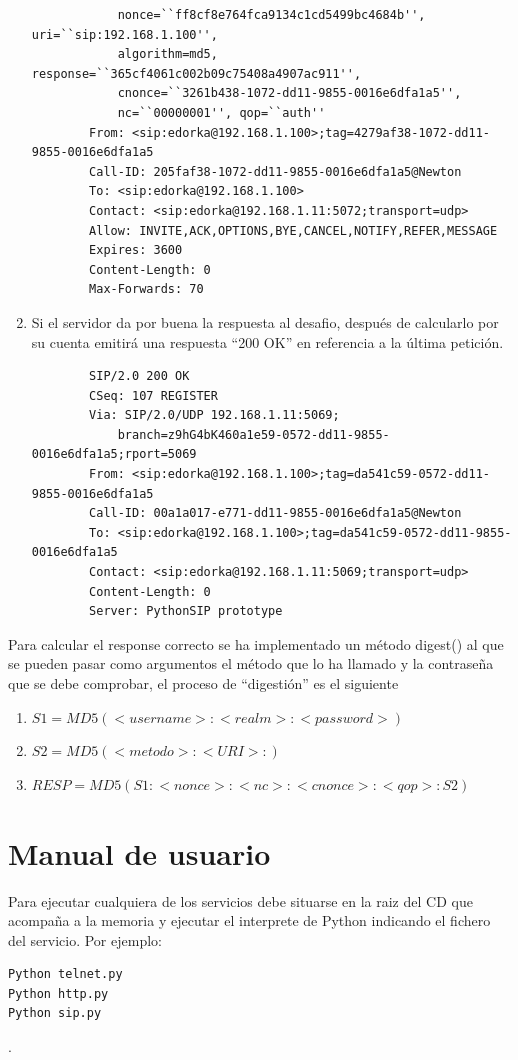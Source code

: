 \documentclass[a4paper,spanish,12pt]{book}
\begin{document}
\begin{enumerate}
\begin{verbatim}
			nonce=``ff8cf8e764fca9134c1cd5499bc4684b'', uri=``sip:192.168.1.100'', 
			algorithm=md5, response=``365cf4061c002b09c75408a4907ac911'', 
			cnonce=``3261b438-1072-dd11-9855-0016e6dfa1a5'', 
			nc=``00000001'', qop=``auth''
		From: <sip:edorka@192.168.1.100>;tag=4279af38-1072-dd11-9855-0016e6dfa1a5
		Call-ID: 205faf38-1072-dd11-9855-0016e6dfa1a5@Newton
		To: <sip:edorka@192.168.1.100>
		Contact: <sip:edorka@192.168.1.11:5072;transport=udp>
		Allow: INVITE,ACK,OPTIONS,BYE,CANCEL,NOTIFY,REFER,MESSAGE
		Expires: 3600
		Content-Length: 0
		Max-Forwards: 70
		\end{verbatim}
		\normalsize
	\item Si el servidor da por buena la respuesta al desafio, despu\'es de calcularlo por su cuenta emitirá una respuesta ``200 OK'' en referencia a la última petición.
		\scriptsize
		\begin{verbatim}
		SIP/2.0 200 OK
		CSeq: 107 REGISTER
		Via: SIP/2.0/UDP 192.168.1.11:5069;
			branch=z9hG4bK460a1e59-0572-dd11-9855-0016e6dfa1a5;rport=5069
		From: <sip:edorka@192.168.1.100>;tag=da541c59-0572-dd11-9855-0016e6dfa1a5
		Call-ID: 00a1a017-e771-dd11-9855-0016e6dfa1a5@Newton
		To: <sip:edorka@192.168.1.100>;tag=da541c59-0572-dd11-9855-0016e6dfa1a5
		Contact: <sip:edorka@192.168.1.11:5069;transport=udp>
		Content-Length: 0
		Server: PythonSIP prototype
		\end{verbatim}
		\normalsize
\end{enumerate}
Para calcular el response correcto se ha implementado un m\'etodo digest() al que se pueden pasar como argumentos el m\'etodo que lo ha llamado y la contraseña que se debe comprobar, el proceso de ``digestión'' es el siguiente
\begin{enumerate}
	\item \begin{math} S1 = MD5(<username>:<realm>:<password>) \end{math}
	\item \begin{math} S2 = MD5(<metodo>:<URI>:) \end{math}
	\item \begin{math} RESP = MD5(S1:<nonce>:<nc>:<cnonce>:<qop>:S2) \end{math}
\end{enumerate}
\section{Manual de usuario}
Para ejecutar cualquiera de los servicios debe situarse en la raiz del CD que acompaña a la memoria y ejecutar el interprete de Python indicando el fichero del servicio. Por ejemplo:
\begin{verbatim}
Python telnet.py
Python http.py
Python sip.py
\end{verbatim}.
\end{document}
